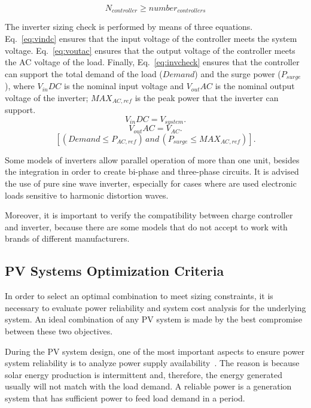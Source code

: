 \begin{equation}
\label{eq:numberofc}
N_{controller} \geq number_{controllers}
\end{equation}

The inverter sizing check is performed by means of three equations. Eq.~\eqref{eq:vindc} ensures that 
the input voltage of the controller meets the system voltage. Eq.~\eqref{eq:voutac} ensures that the 
output voltage of the controller meets the AC voltage of the load. Finally, Eq.~\eqref{eq:invcheck} ensures that 
the controller can support the total demand of the load ($Demand$) and the surge power ($P_{surge}$), 
where $V_{in}DC$ is the nominal input voltage and $V_{out}AC$ is the nominal output voltage of the inverter; 
$MAX_{AC,ref}$ is the peak power that the inverter can support.
%
\begin{equation}
\label{eq:vindc} 
V_{in}DC = V_{system}.
\end{equation}
%
\begin{equation}
\label{eq:voutac} 
V_{out}AC = V_{AC}.
\end{equation}
%
\begin{equation}
\label{eq:invcheck} 
\left[ (Demand \leq P_{AC,ref}) \, and \, (P_{surge} \leq MAX_{AC,ref}) \right].
\end{equation}

Some models of inverters allow parallel operation of more than one unit, besides the integration in order to create bi-phase and three-phase circuits. It is advised the use of pure sine wave inverter, especially for cases where are used electronic loads sensitive to harmonic distortion waves.

Moreover, it is important to verify the compatibility between charge controller and inverter, because there are some models that do not accept to work with brands of different manufacturers.


\subsection{PV Systems Optimization Criteria}
\label{sec:optcriteria}

In order to select an optimal combination to meet sizing constraints, 
it is necessary to evaluate power reliability and system cost analysis for the underlying system. An ideal combination of any PV system is made by the best compromise between these two objectives.

During the PV system design, one of the most important aspects to ensure power system reliability is to analyze power supply availability~\cite{Alsadi2018}. The reason is because solar energy production is intermittent and, therefore, the energy generated usually will not match with the load demand. A reliable power is a generation system that has sufficient power to feed load demand in a period. 

